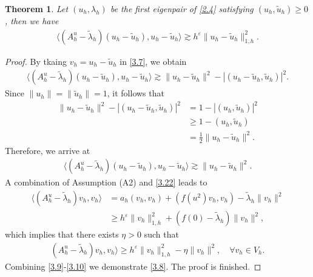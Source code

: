 \documentclass[compress, preprint,9pt]{elsarticle}
\numberwithin{equation}{section}
\newtheorem{theo}{Theorem}[section]
\newcommand{\eps}{\varepsilon}
\newcommand{\la}{\langle}
\newcommand{\ran}{\rangle}
\begin{document}
\begin{theo}\label{theo3.3}
	Let $(u_h,\lambda_h)$ be the first eigenpair of \eqref{2.4} satisfying $(u_h,\widetilde{u}_h)\ge0$, then we have
	\begin{eqnarray}\label{3.8}
		\la (A_h^u-\widetilde{\lambda}_h)(u_h-\widetilde{u}_h),u_h-\widetilde{u}_h\ran\gtrsim h^\eps\|u_h-\widetilde{u}_h\|_{1,h}^2.
	\end{eqnarray}
\end{theo}
\begin{proof}
	By tkaing $v_h=u_h-\widetilde{u}_h$ in \eqref{3.7}, we obtain
	\begin{eqnarray*}
		\la (A_h^u-\widetilde{\lambda}_h)(u_h-\widetilde{u}_h),u_h-\widetilde{u}_h\ran
		\gtrsim\|u_h-\widetilde{u}_h\|^2-|(u_h-\widetilde{u}_h,\widetilde{u}_h)|^2.
	\end{eqnarray*}
	Since $\|u_h\|=\|\widetilde{u}_h\|=1$, it follows that
	\begin{eqnarray*}
		\|u_h-\widetilde{u}_h\|^2-|(u_h-\widetilde{u}_h,\widetilde{u}_h)|^2
		&=1-|(u_h,\widetilde{u}_h)|^2\\
		&\ge1-(u_h,\widetilde{u}_h)\\
		&=\frac12\|u_h-\widetilde{u}_h\|^2.
	\end{eqnarray*}
	Therefore, we arrive at
	\begin{eqnarray}\label{3.9}
		\la (A_h^u-\widetilde{\lambda}_h)(u_h-\widetilde{u}_h),u_h-\widetilde{u}_h\ran
		\gtrsim\|u_h-\widetilde{u}_h\|^2.
	\end{eqnarray}
	A combination of Assumption (A2) and \eqref{3.22} leads to
	\begin{eqnarray*}
		\la (A_h^u-\widetilde{\lambda}_h)v_h,v_h\ran&=a_h(v_h,v_h)+(f(u^2)v_h,v_h)-\widetilde{\lambda}_h\|v_h\|^2\\
		&\ge h^\eps\|v_h\|_{1,h}^2+(f(0)-\widetilde{\lambda}_h)\|v_h\|^2,
	\end{eqnarray*}
	which implies that there exists $\eta>0$ such that
	\begin{eqnarray}\label{3.10}
		(A_h^u-\widetilde{\lambda}_h)v_h,v_h\ran\ge h^\eps\|v_h\|_{1,h}^2-\eta\|v_h\|^2,\quad\forall v_h\in V_h.
	\end{eqnarray}
	Combining \eqref{3.9}-\eqref{3.10} we demonstrate \eqref{3.8}. The proof is finished.
\end{proof}
\end{document}
